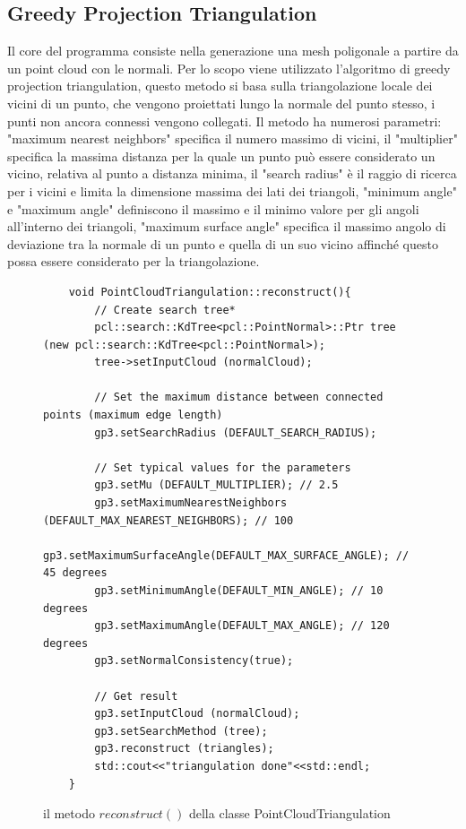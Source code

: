 \documentclass[a4paper,12pt]{article}
\begin{document}
	\subsection{Greedy Projection Triangulation}
	Il core del programma consiste nella generazione una mesh poligonale a partire da un point cloud con le normali.
	Per lo scopo viene utilizzato l'algoritmo di greedy projection triangulation, questo metodo si basa sulla triangolazione
	locale dei vicini di un punto, che vengono proiettati lungo la normale del punto stesso, i punti non ancora connessi
	vengono collegati. Il metodo ha numerosi parametri: "maximum nearest neighbors" specifica il numero massimo di vicini,
	il "multiplier" specifica la massima distanza per la quale un punto può essere considerato un vicino, relativa al punto
	a distanza minima, il "search radius" è il raggio di ricerca per i vicini e limita la dimensione massima dei lati dei 
	triangoli, "minimum angle" e "maximum angle" definiscono il massimo e il minimo valore per gli angoli all'interno dei 
	triangoli, "maximum surface angle" specifica il massimo angolo di deviazione tra la normale di un punto e quella di
	un suo vicino affinché questo possa essere considerato per la triangolazione.
	\begin{figure}[H]
	\begin{lstlisting}
	void PointCloudTriangulation::reconstruct(){
    	// Create search tree*
    	pcl::search::KdTree<pcl::PointNormal>::Ptr tree (new pcl::search::KdTree<pcl::PointNormal>);
    	tree->setInputCloud (normalCloud);
	
    	// Set the maximum distance between connected points (maximum edge length)
    	gp3.setSearchRadius (DEFAULT_SEARCH_RADIUS);
	
    	// Set typical values for the parameters
    	gp3.setMu (DEFAULT_MULTIPLIER); // 2.5
    	gp3.setMaximumNearestNeighbors (DEFAULT_MAX_NEAREST_NEIGHBORS); // 100
    	gp3.setMaximumSurfaceAngle(DEFAULT_MAX_SURFACE_ANGLE); // 45 degrees
	    gp3.setMinimumAngle(DEFAULT_MIN_ANGLE); // 10 degrees
    	gp3.setMaximumAngle(DEFAULT_MAX_ANGLE); // 120 degrees
    	gp3.setNormalConsistency(true);

    	// Get result
    	gp3.setInputCloud (normalCloud);
    	gp3.setSearchMethod (tree);
    	gp3.reconstruct (triangles);
    	std::cout<<"triangulation done"<<std::endl;
	}
	\end{lstlisting}
	\caption{il metodo $reconstruct()$ della classe PointCloudTriangulation}
	\label{reconstruct}
	\end{figure}
	\clearpage
	
\end{document}
